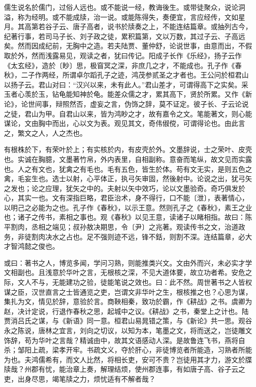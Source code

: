 \documentclass[]{article}
\begin{document}
儒生说名於儒门，过俗人远也。或不能说一经，教诲後生。或带徒聚众，说论洞溢，称为经明。或不能成牍，治一说。或能陈得失，奏便宜，言应经传，文如星月。其高第若谷子云、唐子高者，说书於牍奏之上，不能连结篇章。或抽列古今，纪著行事，若司马子长、刘子政之徒，累积篇第，文以万数，其过子云、子高远矣。然而因成纪前，无胸中之造。若夫陆贾、董仲舒，论说世事，由意而出，不假取於外，然而浅露易见，观读之者，犹曰传记。阳成子长作《乐经》，扬子云作《太玄经》，造於〔眇〕思，极窅冥之深，非庶几之才，不能成也。孔子作《春秋》，二子作两经，所谓卓尔蹈孔子之迹，鸿茂参贰圣之才者也。王公问於桓君山以扬子云。君山对曰：``汉兴以来，未有此人。''君山差才，可谓得高下之实矣。采玉者心羡於玉，钻龟能知神於龟。能差众儒之才，累其高下，贤於所累。又作《新论》，论世间事，辩照然否，虚妄之言，伪饰之辞，莫不证定。彼子长、子云论说之徒，君山为甲。自君山以来，皆为鸿眇之才，故有嘉令之文。笔能著文，则心能谋论，文由胸中而出，心以文为表。观见其文，奇伟俶傥，可谓得论也。由此言之，繁文之人，人之杰也。

有根株於下，有荣叶於上；有实核於内，有皮壳於外。文墨辞说，士之荣叶、皮壳也。实诚在胸臆，文墨著竹帛，外内表里，自相副称。意奋而笔纵，故文见而实露也。人之有文也，犹禽之有毛也。毛有五色，皆生於体。苟有文无实，是则五色之禽，毛妄生也。选士以射，心平体正，执弓矢审固，然後射中。论说之出，犹弓矢之发也；论之应理，犹矢之中的。夫射以矢中效巧，论以文墨验奇。奇巧俱发於心，其实一也。文有深指巨略，君臣治术，身不得行，口不能〔泄〕，表著情心，以明己之必能为之也。孔子作《春秋》，以示王意。然则孔子之《春秋》，素王之业也；诸子之传书，素相之事也。观《春秋》以见王意，读诸子以睹相指。故曰：陈平割肉，丞相之端见；叔孙敖决期思，令〔尹〕之兆著。观读传书之文，治道政务，非徒割肉决水之占也。足不强则迹不远，锋不銛，则割不深。连结篇章，必大才智鸿懿之俊也。

或曰：著书之人，博览多闻，学问习熟，则能推类兴文。文由外而兴，未必实才学文相副也。且浅意於华叶之言，无根核之深，不见大道体要，故立功者希。安危之际，文人不与，无能建功之验，徒能笔说之效也。曰：此不然。周世著书之人皆权谋之臣，汉世直言之士皆通览之吏，岂谓文非华叶之生，根核推之也？心思为谋，集扎为文，情见於辞，意验於言。商鞅相秦，致功於霸，作《耕战》之书。虞卿为赵，决计定说，行退作春秋之思，起城中之议。《耕战》之书，秦堂上之计也。陆贾消吕氏之谋，与《新语》同一意。桓君山易晁错之策，与《新论》共一思。观谷永之陈说，唐林之宜言，刘向之切议，以知为本，笔墨之文，将而送之，岂徒雕文饰辞，苟为华叶之言哉？精诚由中，故其文语感动人深。是故鲁连飞书，燕将自杀；邹阳上疏，梁孝开牢。书疏文义，夺於肝心，非徒博览者所能造，习熟者所能为也。夫鸿儒希有，而文人比然，将相长吏，安可不贵？岂徒用其才力，游文於牒牍哉？州郡有忧，能治章上奏，解理结烦，使州郡连事，有如唐子高、谷子云之吏，出身尽思，竭笔牍之力，烦忧适有不解者哉？
\end{document}

